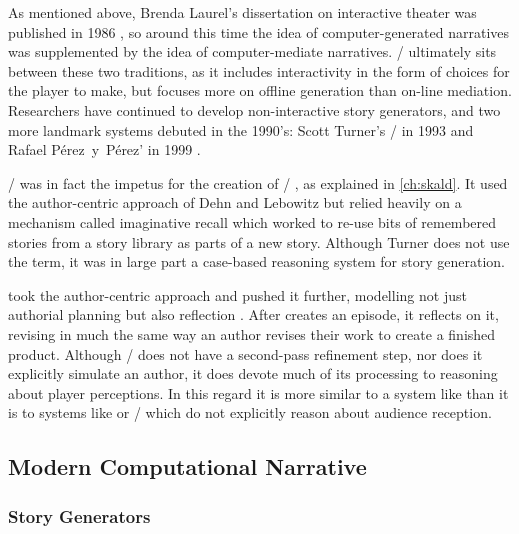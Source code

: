 As mentioned above, Brenda Laurel's dissertation on interactive theater was published in 1986 \citep{Laurel1986}, so around this time the idea of computer-generated narratives was supplemented by the idea of computer-mediate narratives.
%
\dunyazad/ ultimately sits between these two traditions, as it includes interactivity in the form of choices for the player to make, but focuses more on offline generation than on-line mediation.
%
Researchers have continued to develop non-interactive story generators, and two more landmark systems debuted in the 1990's: Scott Turner's \minstrel/ in 1993 and Rafael P\'{e}rez~y~P\'{e}rez'  in 1999 \citep{Turner1993,PerezyPerez1999}.


\minstrel/ was in fact the impetus for the creation of \dunyazad/ , as explained in \cref{ch:skald}.
%
It used the author-centric approach of Dehn and Lebowitz but relied heavily on a mechanism called imaginative recall which worked to re-use bits of remembered stories from a story library as parts of a new story.
%
Although Turner does not use the term, it was in large part a case-based reasoning system for story generation.


 took the author-centric approach and pushed it further, modelling not just authorial planning but also reflection \citep{PerezyPerez2001}.
%
After  creates an episode, it reflects on it, revising in much the same way an author revises their work to create a finished product.
%
Although \dunyazad/ does not have a second-pass refinement step, nor does it explicitly simulate an author, it does devote much of its processing to reasoning about player perceptions.
%
In this regard it is more similar to a system like  than it is to systems like  or \minstrel/ which do not explicitly reason about audience reception.


\subsection{Modern Computational Narrative}


\subsubsection{Story Generators}

